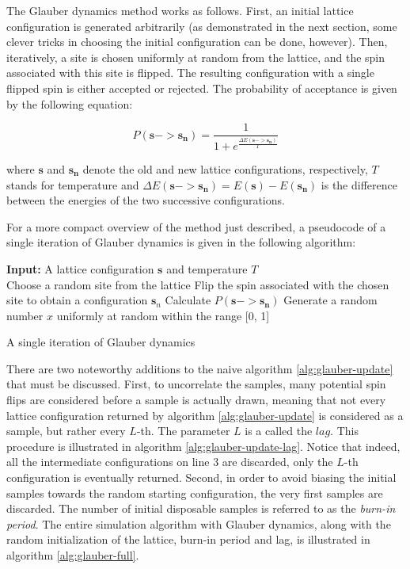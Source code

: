 \documentclass[12pt]{article}
\begin{document}
The Glauber dynamics method works as follows. First, an initial lattice configuration is generated arbitrarily (as demonstrated in the next section, some clever tricks in choosing the initial configuration can be done, however). Then, iteratively, a site is chosen uniformly at random from the lattice, and the spin associated with this site is flipped. The resulting configuration with a single flipped spin is either accepted or rejected. The probability of acceptance is given by the following equation:

\begin{equation}
P(\boldsymbol{s} -> \boldsymbol{s_n}) = \frac{1}{1 + e^\frac{\Delta E(\boldsymbol{s} -> \boldsymbol{s_n})}{T}}
\label{eq:glauber-accept-prob}
\end{equation}

where $\boldsymbol{s}$ and $\boldsymbol{s_n}$ denote the old and new lattice configurations, respectively, $T$ stands for temperature and $\Delta E(\boldsymbol{s} -> \boldsymbol{s_n}) = E(\boldsymbol{s}) - E(\boldsymbol{s_n})$ is the difference between the energies of the two successive configurations. 

For a more compact overview of the method just described, a pseudocode of a single iteration of Glauber dynamics is given in the following algorithm:

\begin{algorithm}
\textbf{Input:} A lattice configuration $\boldsymbol{s}$ and temperature $T$\\
Choose a random site from the lattice\;
Flip the spin associated with the chosen site to obtain a configuration $\boldsymbol{s}_n$\;
Calculate $P(\boldsymbol{s} -> \boldsymbol{s_n})$\;
Generate a random number $x$ uniformly at random within the range [0, 1]\;
\caption{A single iteration of Glauber dynamics}
\label{alg:glauber-update}
\end{algorithm}

There are two noteworthy additions to the naive algorithm \ref{alg:glauber-update} that must be discussed. First, to uncorrelate the samples, many potential spin flips are considered before a sample is actually drawn, meaning that not every lattice configuration returned by algorithm \ref{alg:glauber-update} is considered as a sample, but rather every $L$-th. The parameter $L$ is a called the $lag$. This procedure is illustrated in algorithm \ref{alg:glauber-update-lag}. Notice that indeed, all the intermediate configurations on line $3$ are discarded,  only the $L$-th configuration is eventually returned. Second, in order to avoid biasing the initial samples towards the random starting configuration, the very first samples are discarded. The number of initial disposable samples is referred to as the \textit{burn-in period}. The entire simulation algorithm with Glauber dynamics, along with the random initialization of the lattice, burn-in period and lag, is illustrated in algorithm \ref{alg:glauber-full}.
\end{document}
